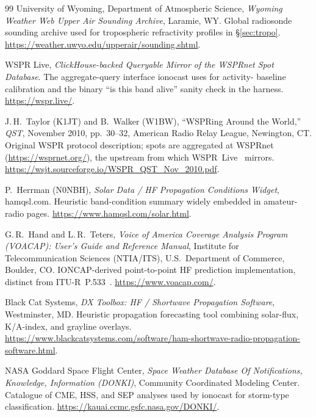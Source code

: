 \documentclass[11pt,a4paper]{article}
\begin{document}
\begin{thebibliography}{99}
  University of Wyoming, Department of Atmospheric Science,
  \emph{Wyoming Weather Web Upper Air Sounding Archive},
  Laramie, WY.  Global radiosonde sounding archive used for
  tropospheric refractivity profiles in \S\ref{sec:tropo}.
  \url{https://weather.uwyo.edu/upperair/sounding.shtml}.

  WSPR Live,
  \emph{ClickHouse-backed Queryable Mirror of the WSPRnet Spot
  Database}.
  The aggregate-query interface ionocast uses for activity-
  baseline calibration and the binary ``is this band alive''
  sanity check in the harness.
  \url{https://wspr.live/}.

  J.\,H.~Taylor (K1JT) and B.~Walker (W1BW),
  ``WSPRing Around the World,''
  \emph{QST}, November 2010, pp.~30--32, American Radio Relay
  League, Newington, CT.
  Original WSPR protocol description; spots are aggregated at
  WSPRnet (\url{https://wsprnet.org/}), the upstream from which
  WSPR~Live~\cite{wsprlive} mirrors.
  \url{https://wsjt.sourceforge.io/WSPR_QST_Nov_2010.pdf}.

  P.~Herrman (N0NBH),
  \emph{Solar Data / HF Propagation Conditions Widget},
  hamqsl.com.  Heuristic band-condition summary widely embedded
  in amateur-radio pages.
  \url{https://www.hamqsl.com/solar.html}.

  G.\,R.~Hand and L.\,R.~Teters,
  \emph{Voice of America Coverage Analysis Program (VOACAP):
  User's Guide and Reference Manual},
  Institute for Telecommunication Sciences (NTIA/ITS),
  U.S.~Department of Commerce, Boulder, CO.  IONCAP-derived
  point-to-point HF prediction implementation, distinct from
  ITU-R~P.533~\cite{itup533}.
  \url{https://www.voacap.com/}.

  Black Cat Systems,
  \emph{DX Toolbox: HF / Shortwave Propagation Software},
  Westminster, MD.  Heuristic propagation forecasting tool
  combining solar-flux, K/A-index, and grayline overlays.
  \url{https://www.blackcatsystems.com/software/ham-shortwave-radio-propagation-software.html}.

  NASA Goddard Space Flight Center,
  \emph{Space Weather Database Of Notifications, Knowledge,
  Information (DONKI)},
  Community Coordinated Modeling Center.
  Catalogue of CME, HSS, and SEP analyses used by ionocast for
  storm-type classification.
  \url{https://kauai.ccmc.gsfc.nasa.gov/DONKI/}.

\end{thebibliography}
\end{document}
